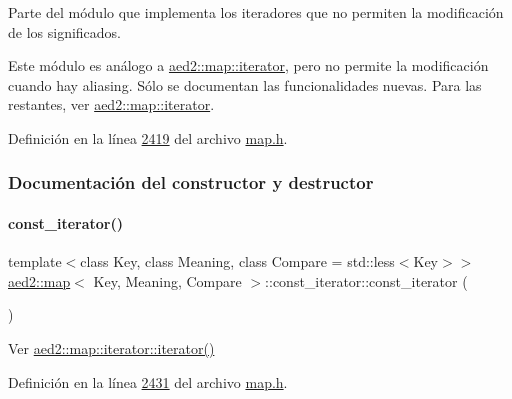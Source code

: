 Parte del módulo que implementa los iteradores que no permiten la modificación de los significados. 

Este módulo es análogo a \hyperlink{classaed2_1_1map_1_1iterator}{aed2\+::map\+::iterator}, pero no permite la modificación cuando hay aliasing. Sólo se documentan las funcionalidades nuevas. Para las restantes, ver \hyperlink{classaed2_1_1map_1_1iterator}{aed2\+::map\+::iterator}. 

Definición en la línea \hyperlink{map_8h_source_l02419}{2419} del archivo \hyperlink{map_8h_source}{map.\+h}.



\subsubsection{Documentación del constructor y destructor}
\mbox{\label{classaed2_1_1map_1_1const__iterator_a8add3e4cabbdaf313b0e085064491555_a8add3e4cabbdaf313b0e085064491555}} 
\paragraph{\texorpdfstring{const\+\_\+iterator()}{const\_iterator()}\hspace{0.1cm}{\footnotesize\ttfamily [1/3]}}
{\footnotesize\ttfamily template$<$class Key, class Meaning, class Compare = std\+::less$<$\+Key$>$$>$ \\
\hyperlink{classaed2_1_1map}{aed2\+::map}$<$ Key, Meaning, Compare $>$\+::const\+\_\+iterator\+::const\+\_\+iterator (\begin{DoxyParamCaption}{ }\end{DoxyParamCaption})\hspace{0.3cm}{\ttfamily [inline]}}



Ver \hyperlink{classaed2_1_1map_1_1iterator_acdd790eb54216601a2e0591776004dba_acdd790eb54216601a2e0591776004dba}{aed2\+::map\+::iterator\+::iterator()} 



Definición en la línea \hyperlink{map_8h_source_l02431}{2431} del archivo \hyperlink{map_8h_source}{map.\+h}.

